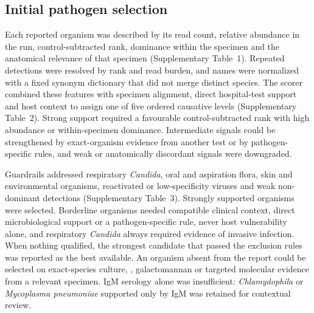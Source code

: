 \subsection*{Initial pathogen selection}
Each reported organism was described by its read count, relative abundance in the run, control-subtracted rank, dominance within the specimen and the anatomical relevance of that specimen (Supplementary Table~1). Repeated detections were resolved by rank and read burden, and names were normalized with a fixed synonym dictionary that did not merge distinct species. The scorer combined these features with specimen alignment, direct hospital-test support and host context to assign one of five ordered causative levels (Supplementary Table~2). Strong support required a favourable control-subtracted rank with high abundance or within-specimen dominance. Intermediate signals could be strengthened by exact-organism evidence from another test or by pathogen-specific rules, and weak or anatomically discordant signals were downgraded.

Guardrails addressed respiratory \textit{Candida}, oral and aspiration flora, skin and environmental organisms, reactivated or low-specificity viruses and weak non-dominant detections (Supplementary Table~3). Strongly supported organisms were selected. Borderline organisms needed compatible clinical context, direct microbiological support or a pathogen-specific rule, never host vulnerability alone, and respiratory \textit{Candida} always required evidence of invasive infection. When nothing qualified, the strongest candidate that passed the exclusion rules was reported as the best available. An organism absent from the \mngs report could be selected on exact-species culture, \filmarray, galactomannan or targeted molecular evidence from a relevant specimen. IgM serology alone was insufficient: \textit{Chlamydophila} or \textit{Mycoplasma pneumoniae} supported only by IgM was retained for contextual review.

